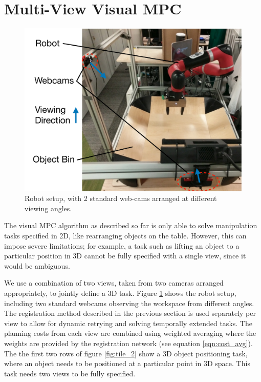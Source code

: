 \section{Multi-View Visual MPC}
\label{sec:multiview}
\begin{figure}
	\centering
	\includegraphics[width=0.45\columnwidth]{images_general/robot_setup_scheme.pdf}
	\caption{\small{Robot setup, with 2 standard web-cams arranged at different viewing angles.}}	\label{fig:robot_setup}
\end{figure}

The visual MPC algorithm as described so far is only able to solve manipulation tasks specified in 2D, like rearranging objects on the table. However, this can impose severe limitations; for example, a task such as lifting an object to a particular position in 3D cannot be fully specified with a single view, since it would be ambiguous. 

We use a combination of two views, taken from two cameras arranged appropriately, to jointly define a 3D task. Figure \ref{fig:robot_setup} shows the robot setup, including two standard webcams observing the workspace from different angles. The registration method described in the previous section is used separately per view to allow for dynamic retrying and solving temporally extended tasks. The planning costs from each view are combined using weighted averaging where the weights are provided by the registration network (see equation \ref{eqn:cost_avg}). The the first two rows of figure \ref{fig:tile_2} show a 3D object positioning task, where an object needs to be positioned at a particular point in 3D space. This task needs two views to be fully specified.





